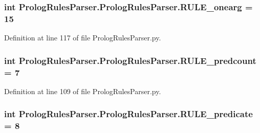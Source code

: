 \subsubsection[{R\+U\+L\+E\+\_\+onearg}]{\setlength{\rightskip}{0pt plus 5cm}int Prolog\+Rules\+Parser.\+Prolog\+Rules\+Parser.\+R\+U\+L\+E\+\_\+onearg = 15\hspace{0.3cm}{\ttfamily [static]}}\label{class_prolog_rules_parser_1_1_prolog_rules_parser_a0d30f19f3b36d3c49b90787774d3124a}


Definition at line 117 of file Prolog\+Rules\+Parser.\+py.

\hypertarget{class_prolog_rules_parser_1_1_prolog_rules_parser_af5635e81bdacbddb983515a39a661e56}{}
\subsubsection[{R\+U\+L\+E\+\_\+predcount}]{\setlength{\rightskip}{0pt plus 5cm}int Prolog\+Rules\+Parser.\+Prolog\+Rules\+Parser.\+R\+U\+L\+E\+\_\+predcount = 7\hspace{0.3cm}{\ttfamily [static]}}\label{class_prolog_rules_parser_1_1_prolog_rules_parser_af5635e81bdacbddb983515a39a661e56}


Definition at line 109 of file Prolog\+Rules\+Parser.\+py.

\hypertarget{class_prolog_rules_parser_1_1_prolog_rules_parser_acaa0ad440cba170a8586f0d78a6bf7e2}{}
\subsubsection[{R\+U\+L\+E\+\_\+predicate}]{\setlength{\rightskip}{0pt plus 5cm}int Prolog\+Rules\+Parser.\+Prolog\+Rules\+Parser.\+R\+U\+L\+E\+\_\+predicate = 8\hspace{0.3cm}{\ttfamily [static]}}\label{class_prolog_rules_parser_1_1_prolog_rules_parser_acaa0ad440cba170a8586f0d78a6bf7e2}


